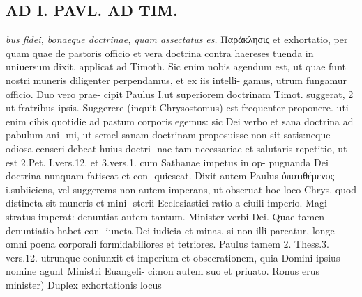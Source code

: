 \documentclass{article}
\begin{document}
\begin{pages}
\section*{AD I. PAVL. AD TIM. }
\marginpar{[ p.200 ]}\textit{bus fidei, bonaeque doctrinae, quam assectatus} \textit{es.} Παράκλησις et exhortatio, per quam quae de pastoris officio et vera doctrina contra haereses tuenda in uniuersum dixit, applicat ad Timoth. Sic enim nobis agendum est, ut quae funt nostri muneris diligenter perpendamus, et ex iis intelli- gamus, utrum fungamur officio. Duo vero prae- cipit Paulus I.ut superiorem doctrinam Timot. suggerat, 2 ut fratribus ipsis. Suggerere (inquit Chrysostomus) est frequenter proponere. uti enim cibis quotidie ad pastum corporis egemus: sic Dei verbo et sana doctrina ad pabulum ani- mi, ut semel sanam doctrinam proposuisse non sit satis:neque odiosa censeri debeat huius doctri- nae tam necessariae et salutaris repetitio, ut est 2.Pet. I.vers.12. et 3.vers.1. cum Sathanae impetus in op- pugnanda Dei doctrina nunquam fatiscat et con- quiescat. Dixit autem Paulus ὐποτιθέμενος i.subiiciens, vel suggerems non autem imperans, ut obseruat hoc loco Chrys. quod distincta sit muneris et mini- sterii Ecclesiastici ratio a ciuili imperio. Magi- stratus imperat: denuntiat autem tantum. Minister verbi Dei. Quae tamen denuntiatio habet con- iuncta Dei iudicia et minas, si non illi pareatur, longe omni poena corporali formidabiliores et tetriores. Paulus tamem 2. Thess.3. vers.12. utrunque coniunxit et imperium et obsecrationem, quia Domini ipsius nomine agunt Ministri Euangeli- ci:non autem suo et priuato. Ronus erus minister) Duplex exhortationis locus 

\end{pages}
\end{document}
